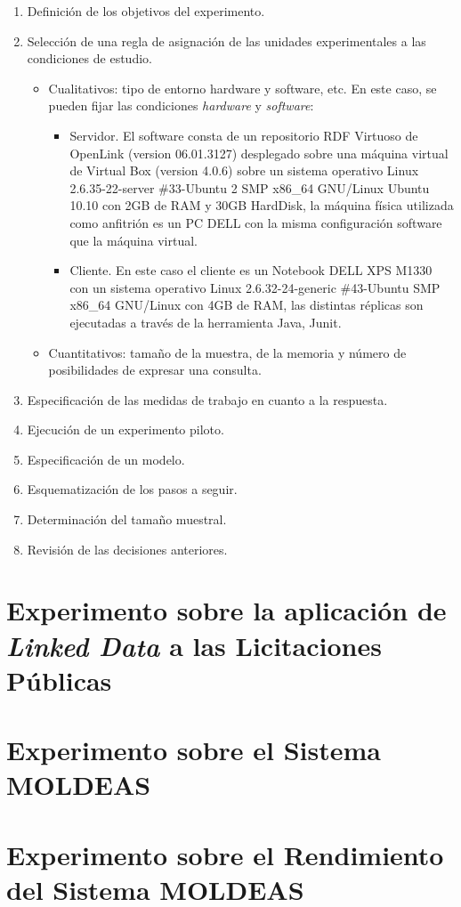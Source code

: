 \begin{enumerate}
 \item Definición de los objetivos del experimento. 
\item Selección de una regla de asignación de las unidades experimentales a las condiciones de estudio. 
\begin{itemize}
 \item Cualitativos: tipo de entorno hardware y software, etc. En este caso, se pueden fijar las condiciones \textit{hardware} y \textit{software}:
  \begin{itemize}
  \item Servidor. El software consta de un repositorio \gls{RDF} Virtuoso de OpenLink (version 06.01.3127) desplegado sobre una máquina 
  virtual de Virtual Box (version 4.0.6) sobre un sistema operativo Linux 2.6.35-22-server \#33-Ubuntu 2 SMP x86\_64 GNU/Linux Ubuntu 10.10 con 2GB de RAM y 30GB HardDisk, la 
  máquina física utilizada como anfitrión es un PC DELL con la misma configuración software que la máquina virtual.
  \item Cliente. En este caso el cliente es un Notebook DELL XPS M1330 con un sistema operativo Linux 2.6.32-24-generic \#43-Ubuntu SMP x86\_64 GNU/Linux con 4GB de RAM, las distintas 
  réplicas son ejecutadas a través de la herramienta Java, Junit.
  \end{itemize}
 \item Cuantitativos: tamaño de la muestra, de la memoria y número de posibilidades de expresar una consulta.
\end{itemize}
 \item Especificación de las medidas de trabajo en cuanto a la respuesta.
 \item Ejecución de un experimento piloto. 
 \item Especificación de un modelo.
 \item Esquematización de los pasos a seguir. 
 \item Determinación del tamaño muestral.
 \item Revisión de las decisiones anteriores.
\end{enumerate}


\section{Experimento sobre la aplicación de \textit{Linked Data} a las Licitaciones Públicas}

\section{Experimento sobre el Sistema MOLDEAS}

\section{Experimento sobre el Rendimiento del Sistema MOLDEAS}

